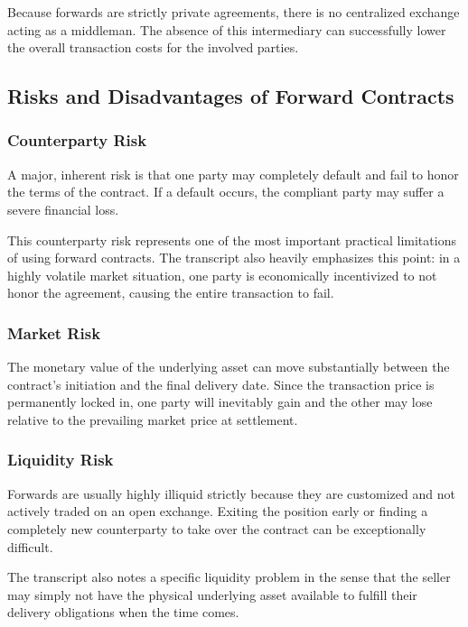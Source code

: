 \documentclass[12pt,openany]{book}
\begin{document}
Because forwards are strictly private agreements, there is no centralized exchange acting as a middleman. The absence of this intermediary can successfully lower the overall transaction costs for the involved parties.

\subsection{Risks and Disadvantages of Forward Contracts}

\subsubsection{Counterparty Risk}

A major, inherent risk is that one party may completely default and fail to honor the terms of the contract. If a default occurs, the compliant party may suffer a severe financial loss.

This counterparty risk represents one of the most important practical limitations of using forward contracts. The transcript also heavily emphasizes this point: in a highly volatile market situation, one party is economically incentivized to not honor the agreement, causing the entire transaction to fail.

\subsubsection{Market Risk}

The monetary value of the underlying asset can move substantially between the contract's initiation and the final delivery date. Since the transaction price is permanently locked in, one party will inevitably gain and the other may lose relative to the prevailing market price at settlement.

\subsubsection{Liquidity Risk}

Forwards are usually highly illiquid strictly because they are customized and not actively traded on an open exchange. Exiting the position early or finding a completely new counterparty to take over the contract can be exceptionally difficult.

The transcript also notes a specific liquidity problem in the sense that the seller may simply not have the physical underlying asset available to fulfill their delivery obligations when the time comes.
\end{document}
